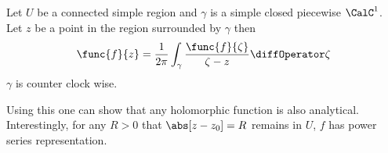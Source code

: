 \begin{theorem}
    Let \(U\) be a connected simple region and \(\gamma\) is a simple closed piecewise \(\CalC^1\). Let \(z\) be a point in the region surrounded by \(\gamma\) then
    \begin{equation*}
        \func{f}{z} = \frac{1}{2 \pi} \int_{\gamma} \frac{\func{f}{\zeta}}{\zeta - z} \diffOperator \zeta
    \end{equation*}
    \(\gamma\) is counter clock wise.
\end{theorem}

Using this one can show that any holomorphic function is also analytical. Interestingly, for any \(R > 0\) that \(\abs[z - z_0] = R\) remains in \(U\), \(f\) has power series representation.